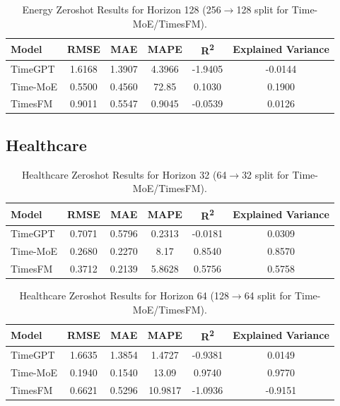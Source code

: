 \begin{table}[h!]
\centering
\begin{tabular}{lccccc}
\hline
Model      & RMSE   & MAE    & MAPE    & R\textsuperscript{2} & Explained Variance \\
\hline
TimeGPT    & 1.6168 & 1.3907 & 4.3966  & -1.9405 & -0.0144 \\
Time-MoE   & 0.5500 & 0.4560 & 72.85   & 0.1030  & 0.1900 \\
TimesFM    & 0.9011 & 0.5547 & 0.9045  & -0.0539 & 0.0126 \\
\hline
\end{tabular}
\caption{Energy Zeroshot Results for Horizon 128 (256$\to$128 split for Time-MoE/TimesFM).}
\label{tab:energy_h128}
\end{table}

\newpage
\subsection{Healthcare}

\begin{table}[h!]
\centering
\begin{tabular}{lccccc}
\hline
Model      & RMSE   & MAE    & MAPE    & R\textsuperscript{2} & Explained Variance \\
\hline
TimeGPT    & 0.7071 & 0.5796 & 0.2313  & -0.0181 & 0.0309 \\
Time-MoE   & 0.2680 & 0.2270 & 8.17    & 0.8540  & 0.8570 \\
TimesFM    & 0.3712 & 0.2139 & 5.8628  & 0.5756  & 0.5758 \\
\hline
\end{tabular}
\caption{Healthcare Zeroshot Results for Horizon 32 (64$\to$32 split for Time-MoE/TimesFM).}
\label{tab:healthcare_h32}
\end{table}

\begin{table}[h!]
\centering
\begin{tabular}{lccccc}
\hline
Model      & RMSE   & MAE    & MAPE    & R\textsuperscript{2} & Explained Variance \\
\hline
TimeGPT    & 1.6635 & 1.3854 & 1.4727  & -0.9381 & 0.0149 \\
Time-MoE   & 0.1940 & 0.1540 & 13.09   & 0.9740  & 0.9770 \\
TimesFM    & 0.6621 & 0.5296 & 10.9817 & -1.0936 & -0.9151 \\
\hline
\end{tabular}
\caption{Healthcare Zeroshot Results for Horizon 64 (128$\to$64 split for Time-MoE/TimesFM).}
\label{tab:healthcare_h64}
\end{table}

